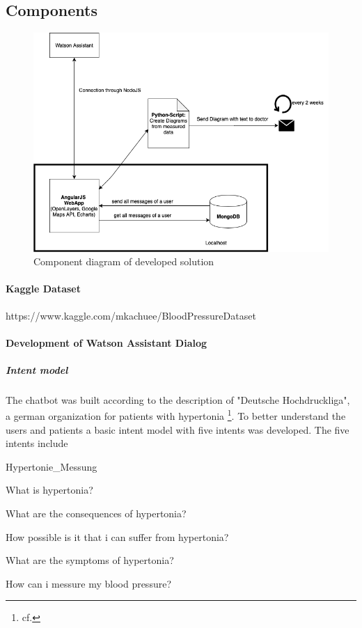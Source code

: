 \subsection{Components}
\begin{figure}[htbp]
	\centering
	\includegraphics[width=1\textwidth]{images/components.png}
	\caption{Component diagram of developed solution}
	\label{ncbi_query}
\end{figure}

\paragraph{Kaggle Dataset}
https://www.kaggle.com/mkachuee/BloodPressureDataset
\paragraph{Development of Watson Assistant Dialog}

\subparagraph{Intent model}

The chatbot was built according to the description of "Deutsche Hochdruckliga", a german organization for patients with hypertonia \footnote{cf.\autocite{hochdruckliga}}.
To better understand the users and patients a basic intent model with five intents was developed. 
The five intents include 

\begin{labeling}{Hypertonie_Messung}
\item [Hypertonie_Definition] What is hypertonia?
\item [Hypertonie_Schaeden] What are the consequences of hypertonia?
\item [Hypertonie_Risiko] How possible is it that i can suffer from hypertonia?
\item [Hypertonie_Symptome] What are the symptoms of hypertonia?
\item [Hypertonie_Messung] How can i messure my blood pressure?
\end{labeling}

